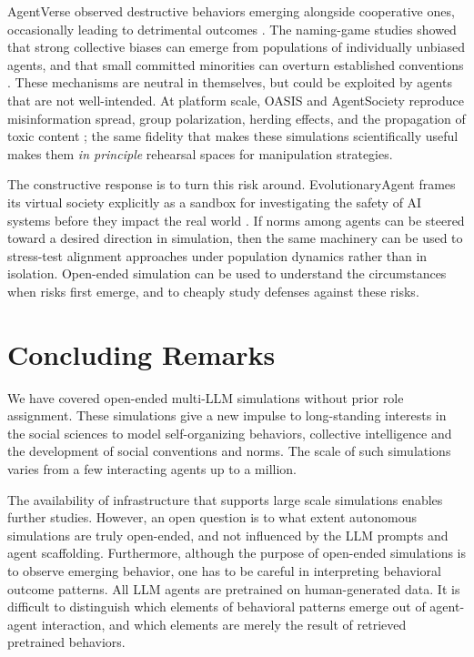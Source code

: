 AgentVerse observed destructive behaviors emerging alongside cooperative ones, occasionally leading to detrimental outcomes \citep{chen2023agentverse}. The naming-game studies showed that strong collective biases can emerge from populations of individually unbiased agents, and that small committed minorities can overturn established conventions \citep{ashery2024dynamics, kouwenhoven2024searching}. These mechanisms are neutral in themselves, but could be exploited by agents that are not well-intended. At platform scale, OASIS and AgentSociety reproduce misinformation spread, group polarization, herding effects, and the propagation of toxic content \citep{yang2024oasis, piao2025polarization}; the same fidelity that makes these simulations scientifically useful makes them \emph{in principle} rehearsal spaces for manipulation strategies.

The constructive response is to turn this risk around. EvolutionaryAgent frames its virtual society explicitly as a sandbox for investigating the safety of AI systems before they impact the real world \citep{li2024agent}. If norms among agents can be steered toward a desired direction in simulation, then the same machinery can be used to stress-test alignment approaches under population dynamics rather than in isolation. Open-ended simulation can be used to understand the circumstances when risks first emerge, and to cheaply study defenses against these risks. 

\section{Concluding Remarks}
We have covered open-ended multi-LLM simulations without prior role assignment. These simulations give a new impulse to long-standing interests in the social sciences to model self-organizing behaviors, collective intelligence and the development of social
conventions and norms. The scale of such simulations varies from a few interacting agents up to a million.

The availability of infrastructure that supports large scale simulations enables further studies. However, an open question is to what extent autonomous simulations are truly open-ended, and not influenced by the LLM prompts and agent scaffolding. Furthermore, although the purpose of open-ended simulations is to observe emerging behavior, one has to be careful in interpreting behavioral outcome patterns. All LLM agents are pretrained on human-generated data. It is difficult to distinguish  which elements of behavioral patterns emerge out of agent-agent interaction, and which elements are merely the result of retrieved pretrained behaviors. 




